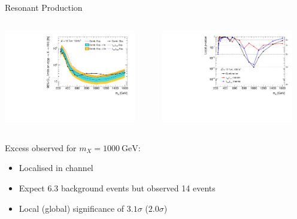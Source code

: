 \documentclass[11pt, xcolor={dvipsnames}, aspectratio=169]{beamer}
\begin{document}
\begin{frame}{Resonant \HH Production}
  \vspace*{0.1em}
  \begin{columns}[onlytextwidth]
    \centering

    \includegraphics[width=0.9\textwidth]{results_res/resonant_upper_limits}

    \centering

    \includegraphics[width=0.9\textwidth]{results_res/resonant_comb_pvalues}
  \end{columns}

  Excess observed for $m_{X} = \SI{1000}{\GeV}$:
  \begin{itemize}
  \item Localised in \hadhad channel
  \item Expect 6.3 background events but observed 14 events
  \item Local (global) significance of $3.1\sigma$ ($2.0\sigma$)
  \end{itemize}


\end{frame}
\end{document}
